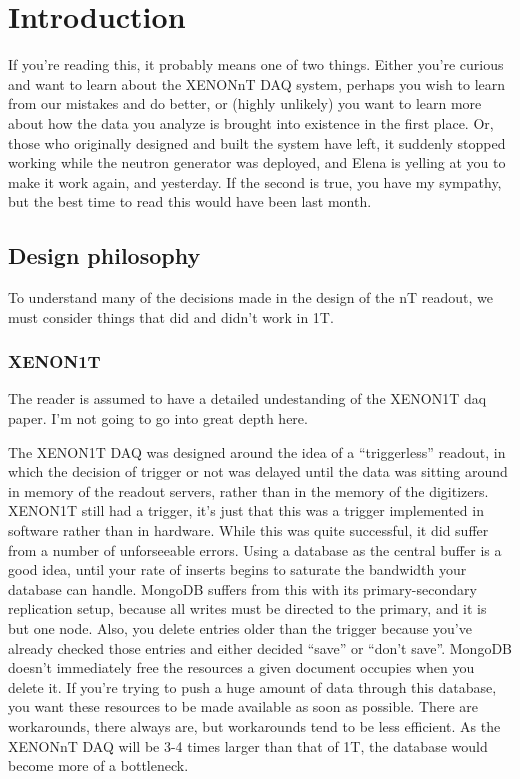 \chapter{Introduction}\label{ch:intro}

If you're reading this, it probably means one of two things.
Either you're curious and want to learn about the XENONnT DAQ system, perhaps you wish to learn from our mistakes and do better, or (highly unlikely) you want to learn more about how the data you analyze is brought into existence in the first place.
Or, those who originally designed and built the system have left, it suddenly stopped working while the neutron generator was deployed, and Elena is yelling at you to make it work again, and yesterday.
If the second is true, you have my sympathy, but the best time to read this would have been last month.

\section{Design philosophy}\label{sec:philosophy}

To understand many of the decisions made in the design of the nT readout, we must consider things that did and didn't work in 1T.

\subsection{XENON1T}\label{sec:1tdaq}

The reader is assumed to have a detailed undestanding of the XENON1T daq paper.
I'm not going to go into great depth here.

The XENON1T DAQ was designed around the idea of a ``triggerless'' readout, in which the decision of trigger or not was delayed until the data was sitting around in memory of the readout servers, rather than in the memory of the digitizers.
XENON1T still had a trigger, it's just that this was a trigger implemented in software rather than in hardware.
While this was quite successful, it did suffer from a number of unforseeable errors.
Using a database as the central buffer is a good idea, until your rate of inserts begins to saturate the bandwidth your database can handle.
MongoDB suffers from this with its primary-secondary replication setup, because all writes must be directed to the primary, and it is but one node.
Also, you delete entries older than the trigger because you've already checked those entries and either decided ``save'' or ``don't save''.
MongoDB doesn't immediately free the resources a given document occupies when you delete it.
If you're trying to push a huge amount of data through this database, you want these resources to be made available as soon as possible.
There are workarounds, there always are, but workarounds tend to be less efficient.
As the XENONnT DAQ will be 3-4 times larger than that of 1T, the database would become more of a bottleneck.

